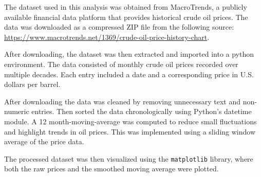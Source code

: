 The dataset used in this analysis was obtained from MacroTrends, a publicly available financial data platform that provides historical crude oil prices. The data was downloaded as a compressed ZIP file from the following source:
\url{https://www.macrotrends.net/1369/crude-oil-price-history-chart}.

After downloading, the dataset was then extracted and imported into a python environment. The data consisted of monthly crude oil prices recorded over multiple decades. Each entry included a date and a corresponding price in U.S. dollars per barrel.

After downloading the data was cleaned by removing unnecessary text and non-numeric entries. Then sorted the data chronologically using Python’s datetime module. A 12 month-moving-average was computed to reduce small fluctuations and highlight trends in oil prices. This was implemented using a sliding window average of the price data.

The processed dataset was then visualized using the \texttt{matplotlib} library, where both the raw prices and the smoothed moving average were plotted.
